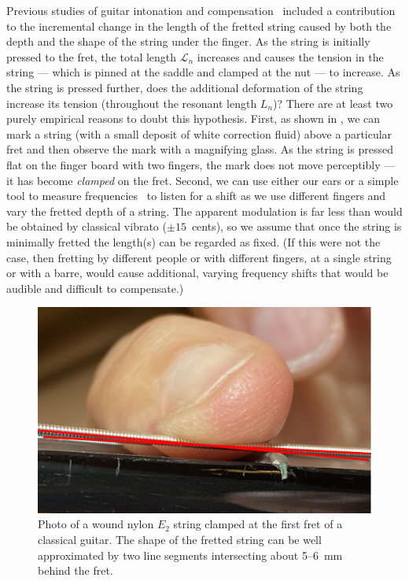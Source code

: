 Previous studies of guitar intonation and compensation~\cite{ref:byers1996cgi,ref:varieschi2010icf} included a contribution to the incremental change in the length of the fretted string caused by both the depth and the shape of the string under the finger. As the string is initially pressed to the fret, the total length $\mathcal{L}_n$ increases and causes the tension in the string --- which is pinned at the saddle and clamped at the nut --- to increase. As the string is pressed further, does the additional deformation of the string increase its tension (throughout the resonant length $L_n$)? There are at least two purely empirical reasons to doubt this hypothesis. First, as shown in , we can mark a string (with a small deposit of white correction fluid) above a particular fret and then observe the mark with a magnifying glass. As the string is pressed flat on the finger board with two fingers, the mark does not move perceptibly --- it has become \emph{clamped} on the fret. Second, we can use either our ears or a simple tool to measure frequencies~\cite{ref:pgtweb} to listen for a shift as we use different fingers and vary the fretted depth of a string. The apparent modulation is far less than would be obtained by classical vibrato ($\pm15$~cents), so we assume that once the string is minimally fretted the length(s) can be regarded as fixed. (If this were not the case, then fretting by different people or with different fingers, at a single string or with a barre, would cause additional, varying frequency shifts that would be audible and difficult to compensate.)


\begin{figure}
    \centering
    \includegraphics[width=6.0in]{figures/fretting_photo}
    \caption{\label{fig:fretting_photo} Photo of a wound nylon $E_2$ string clamped at the first fret of a classical guitar. The shape of the fretted string can be well approximated by two line segments intersecting about 5--6~mm behind the fret.}
\end{figure}

